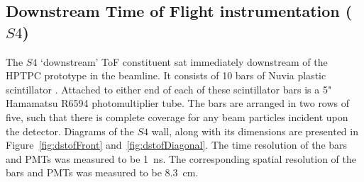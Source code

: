 \subsection{Downstream Time of Flight instrumentation ($S4$)}
	
The $S4$ `downstream' ToF constituent sat immediately downstream of the HPTPC prototype in the beamline. It consists of 10 bars of Nuvia plastic scintillator \cite{NUVIA}. Attached to either end of each of these scintillator bars is a 5" Hamamatsu R6594 photomultiplier tube. The bars are arranged in two rows of five, such that there is complete coverage for any beam particles incident upon the detector. Diagrams of the $S4$ wall, along with its dimensions are presented in Figure~\ref{fig:dstofFront} and~\ref{fig:dstofDiagonal}. The time resolution of the bars and PMTs was measured to be 1~ns. The corresponding spatial resolution of the bars and PMTs was measured to be 8.3~cm.
    
